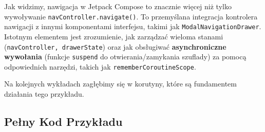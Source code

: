 Jak widzimy, nawigacja w Jetpack Compose to znacznie więcej niż tylko wywoływanie \texttt{navController.navigate()}. To przemyślana integracja kontrolera nawigacji z innymi komponentami interfejsu, takimi jak \texttt{ModalNavigationDrawer}. Istotnym elementem jest zrozumienie, jak zarządzać wieloma stanami (\texttt{navController, drawerState}) oraz jak obsługiwać \textbf{asynchroniczne wywołania} (funkcje \texttt{suspend} do otwierania/zamykania szuflady) za pomocą odpowiednich narzędzi, takich jak \texttt{rememberCoroutineScope}.

Na kolejnych wykładach zagłębimy się w korutyny, które są fundamentem działania tego przykładu.


\subsection{Pełny Kod Przykładu}

